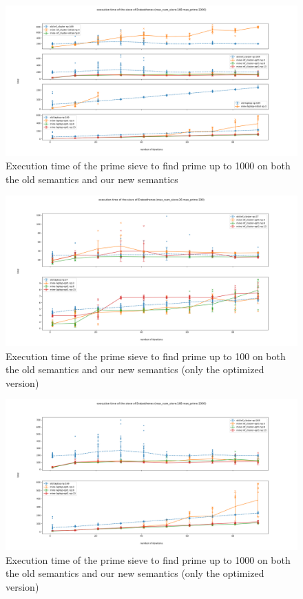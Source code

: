 \begin{figure}[h]
\centering
    \includegraphics[width=1\textwidth]{figures/sieve_all_1000}
\caption{Execution time of the prime sieve to find prime up to 1000 on both the old semantics and our new semantics}
\label{fig:sieve_all_1000}
\end{figure}

\begin{figure}[h]
\centering
    \includegraphics[width=1\textwidth]{figures/sieve_opt1_100}
\caption{Execution time of the prime sieve to find prime up to 100 on both the old semantics and our new semantics (only the optimized version)}
\label{fig:sieve_opt_100}
\end{figure}

\begin{figure}[h]
\centering
    \includegraphics[width=1\textwidth]{figures/sieve_opt1_1000}
\caption{Execution time of the prime sieve to find prime up to 1000 on both the old semantics and our new semantics (only the optimized version)}
\label{fig:sieve_opt_1000}
\end{figure}
